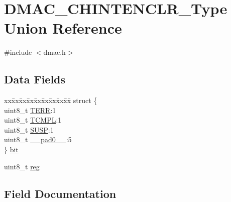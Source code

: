\hypertarget{union_d_m_a_c___c_h_i_n_t_e_n_c_l_r___type}{}\section{D\+M\+A\+C\+\_\+\+C\+H\+I\+N\+T\+E\+N\+C\+L\+R\+\_\+\+Type Union Reference}
\label{union_d_m_a_c___c_h_i_n_t_e_n_c_l_r___type}


{\ttfamily \#include $<$dmac.\+h$>$}

\subsection*{Data Fields}
\begin{DoxyCompactItemize}
\item 
\begin{tabbing}
xx\=xx\=xx\=xx\=xx\=xx\=xx\=xx\=xx\=\kill
struct \{\\
\>uint8\_t \mbox{\hyperlink{union_d_m_a_c___c_h_i_n_t_e_n_c_l_r___type_aec94f800e27f13d8235935c375e2c7c2}{TERR}}:1\\
\>uint8\_t \mbox{\hyperlink{union_d_m_a_c___c_h_i_n_t_e_n_c_l_r___type_a6e8d058c4c4e02edbb191b6d2e19a8b6}{TCMPL}}:1\\
\>uint8\_t \mbox{\hyperlink{union_d_m_a_c___c_h_i_n_t_e_n_c_l_r___type_a5415253423cbe4ee0696caf4f3f25efa}{SUSP}}:1\\
\>uint8\_t \mbox{\hyperlink{union_d_m_a_c___c_h_i_n_t_e_n_c_l_r___type_a8b4eebe79ded0459acec2f4950102ba3}{\_\_pad0\_\_}}:5\\
\} \mbox{\hyperlink{union_d_m_a_c___c_h_i_n_t_e_n_c_l_r___type_a922f93c6a5ce0d52e8c5fc628061b484}{bit}}\\

\end{tabbing}\item 
uint8\+\_\+t \mbox{\hyperlink{union_d_m_a_c___c_h_i_n_t_e_n_c_l_r___type_a9428adc9af4653a2050e2536b55dec8d}{reg}}
\end{DoxyCompactItemize}


\subsection{Field Documentation}
\mbox{\label{union_d_m_a_c___c_h_i_n_t_e_n_c_l_r___type_a8b4eebe79ded0459acec2f4950102ba3}} 
